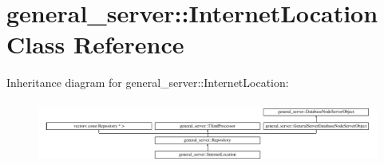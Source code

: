 \hypertarget{classgeneral__server_1_1InternetLocation}{\section{general\-\_\-server\-:\-:\-Internet\-Location \-Class \-Reference}
\label{classgeneral__server_1_1InternetLocation}
}
\-Inheritance diagram for general\-\_\-server\-:\-:\-Internet\-Location\-:\begin{figure}[H]
\begin{center}
\leavevmode
\includegraphics[height=2.097378cm]{classgeneral__server_1_1InternetLocation}
\end{center}
\end{figure}
